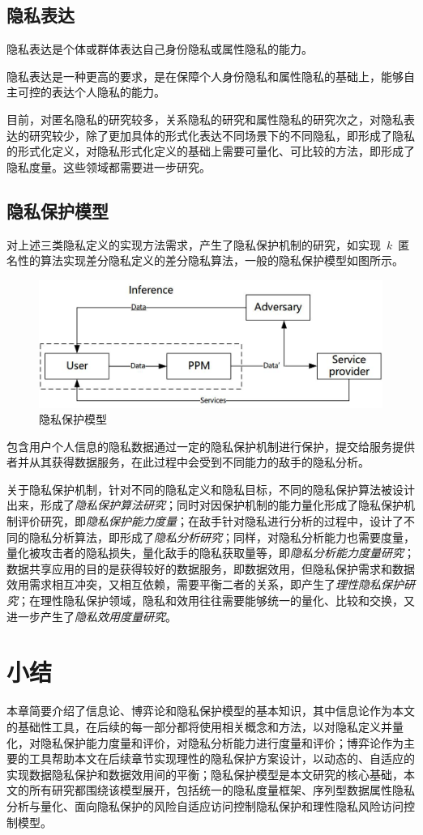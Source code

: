 \subsection{隐私表达}

\begin{definition}
	隐私表达是个体或群体表达自己身份隐私或属性隐私的能力。
\end{definition}

隐私表达是一种更高的要求，是在保障个人身份隐私和属性隐私的基础上，能够自主可控的表达个人隐私的能力。

目前，对匿名隐私的研究较多，关系隐私的研究和属性隐私的研究次之，对隐私表达的研究较少，除了更加具体的形式化表达不同场景下的不同隐私，即形成了隐私的形式化定义，对隐私形式化定义的基础上需要可量化、可比较的方法，即形成了隐私度量。这些领域都需要进一步研究。

\subsection{隐私保护模型}

对上述三类隐私定义的实现方法需求，产生了隐私保护机制的研究，如实现~$k$~匿名性的算法\cite{sweeney2002k}实现差分隐私定义的差分隐私算法\cite{dwork2006differential}，一般的隐私保护模型如图\cite{cha1-ppm.jpg}所示。

\begin{figure}[htbp]
	\centering
	\includegraphics[width = 0.6\linewidth]{./figures/cha1-ppm.jpg}
	\caption{隐私保护模型}
	\label{fig:ppm-model}
\end{figure}

包含用户个人信息的隐私数据通过一定的隐私保护机制进行保护，提交给服务提供者并从其获得数据服务，在此过程中会受到不同能力的敌手的隐私分析。

关于隐私保护机制，针对不同的隐私定义和隐私目标，不同的隐私保护算法被设计出来，形成了\textit{隐私保护算法研究}；同时对因保护机制的能力量化形成了隐私保护机制评价研究，即\textit{隐私保护能力度量}；在敌手针对隐私进行分析的过程中，设计了不同的隐私分析算法，即形成了\textit{隐私分析研究}；同样，对隐私分析能力也需要度量，量化被攻击者的隐私损失，量化敌手的隐私获取量等，即\textit{隐私分析能力度量研究}；数据共享应用的目的是获得较好的数据服务，即数据效用，但隐私保护需求和数据效用需求相互冲突，又相互依赖，需要平衡二者的关系，即产生了\textit{理性隐私保护研究}；在理性隐私保护领域，隐私和效用往往需要能够统一的量化、比较和交换，又进一步产生了\textit{隐私效用度量研究}。

\section{小结}

本章简要介绍了信息论、博弈论和隐私保护模型的基本知识，其中信息论作为本文的基础性工具，在后续的每一部分都将使用相关概念和方法，以对隐私定义并量化，对隐私保护能力度量和评价，对隐私分析能力进行度量和评价；博弈论作为主要的工具帮助本文在后续章节实现理性的隐私保护方案设计，以动态的、自适应的实现数据隐私保护和数据效用间的平衡；隐私保护模型是本文研究的核心基础，本文的所有研究都围绕该模型展开，包括统一的隐私度量框架、序列型数据属性隐私分析与量化、面向隐私保护的风险自适应访问控制隐私保护和理性隐私风险访问控制模型。
